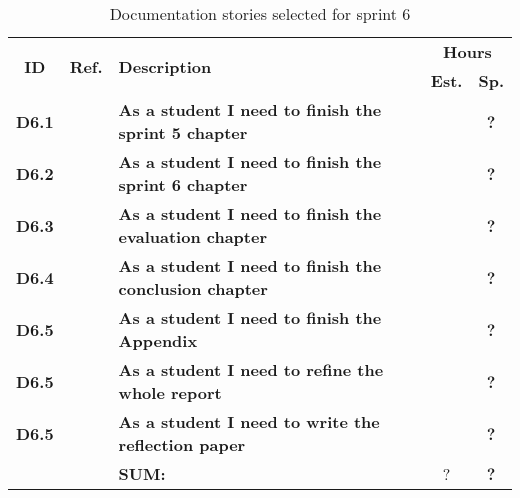 \begin{table*}[!ht]%
 \def\arraystretch{1.25}
 
 \caption{Documentation stories selected for sprint 6}
   \label{tab:sprint6Documentationstories}

\begin{tabularx}{\textwidth}{ccXcc} 

\toprule[0.5mm]
\multirow{2}{*}{\textbf{ID}} &
\multirow{2}{*}{\textbf{Ref.}} & \multirow{2}{*}{\textbf{Description}} & \multicolumn{2}{c}{\textbf{Hours}} \\
 					& & & \textbf{Est.} & \textbf{Sp.} \\
\midrule

\textbf{D6.1} 	& & {\bf As a student I need to finish the sprint 5 chapter} 		&   & \textbf{?} \\
	
\textbf{D6.2} 	& & {\bf As a student I need to finish the sprint 6 chapter} 		& 	& \textbf{?} \\

\textbf{D6.3} 	& & {\bf As a student I need to finish the evaluation chapter} 		& 	& \textbf{?} \\

\textbf{D6.4} 	&& {\bf As a student I need to finish the conclusion chapter} 		& 	& \textbf{?} \\

\textbf{D6.5} 	&& {\bf As a student I need to finish the Appendix} 				& 	& \textbf{?} \\

\textbf{D6.5} 	&& {\bf As a student I need to refine the whole report} 			& 	& \textbf{?} \\
\textbf{D6.5} 	&& {\bf As a student I need to write the reflection paper} 			& 	& \textbf{?} \\
\midrule
		
				&& \textbf{SUM:}		&	?	& \textbf{?}
 \\																			
\bottomrule[0.5mm]
\end{tabularx}
\end{table*}
